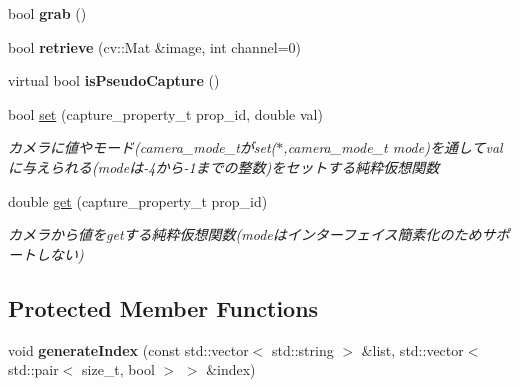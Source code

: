 \begin{DoxyCompactItemize}
bool {\bfseries grab} ()
\item 
\hypertarget{classskl_1_1_video_capture_image_list_ab2291aa8a1dae8966a8f43716cb0d128}{}\label{classskl_1_1_video_capture_image_list_ab2291aa8a1dae8966a8f43716cb0d128} 
bool {\bfseries retrieve} (cv\+::\+Mat \&image, int channel=0)
\item 
\hypertarget{classskl_1_1_video_capture_image_list_ae7b49a05d26607c526c6f8082d15e979}{}\label{classskl_1_1_video_capture_image_list_ae7b49a05d26607c526c6f8082d15e979} 
virtual bool {\bfseries is\+Pseudo\+Capture} ()
\item 
\hypertarget{classskl_1_1_video_capture_image_list_acb500fb9f193ad0c0a94099426b4ebf9}{}\label{classskl_1_1_video_capture_image_list_acb500fb9f193ad0c0a94099426b4ebf9} 
bool \hyperlink{classskl_1_1_video_capture_image_list_acb500fb9f193ad0c0a94099426b4ebf9}{set} (capture\+\_\+property\+\_\+t prop\+\_\+id, double val)
\begin{DoxyCompactList}\small\item\em カメラに値やモード(camera\+\_\+mode\+\_\+tがset($\ast$,camera\+\_\+mode\+\_\+t mode)を通してvalに与えられる(modeは-\/4から-\/1までの整数)をセットする純粋仮想関数 \end{DoxyCompactList}\item 
\hypertarget{classskl_1_1_video_capture_image_list_a439231c580b1e93c68230667bfe07c1e}{}\label{classskl_1_1_video_capture_image_list_a439231c580b1e93c68230667bfe07c1e} 
double \hyperlink{classskl_1_1_video_capture_image_list_a439231c580b1e93c68230667bfe07c1e}{get} (capture\+\_\+property\+\_\+t prop\+\_\+id)
\begin{DoxyCompactList}\small\item\em カメラから値をgetする純粋仮想関数(modeはインターフェイス簡素化のためサポートしない) \end{DoxyCompactList}\end{DoxyCompactItemize}
\subsection*{Protected Member Functions}
\begin{DoxyCompactItemize}
\item 
\hypertarget{classskl_1_1_video_capture_image_list_aa520467fba47f993d72eac492ad34ad0}{}\label{classskl_1_1_video_capture_image_list_aa520467fba47f993d72eac492ad34ad0} 
void {\bfseries generate\+Index} (const std\+::vector$<$ std\+::string $>$ \&list, std\+::vector$<$ std\+::pair$<$ size\+\_\+t, bool $>$ $>$ \&index)
\end{DoxyCompactItemize}
